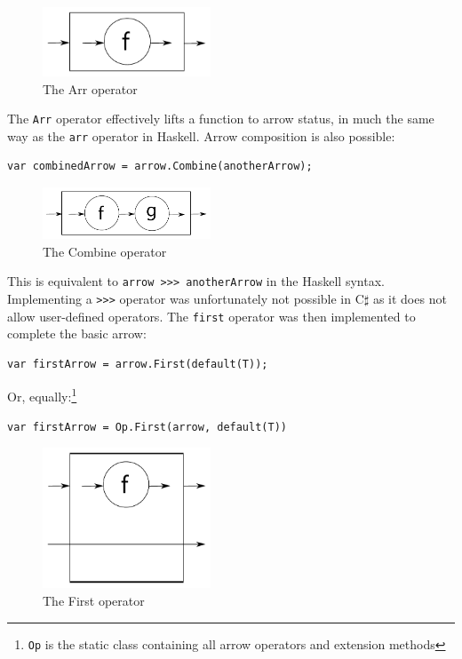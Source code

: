 \documentclass[12pt,twoside,notitlepage]{report}
\begin{document}
\begin{figure}[!ht]
  \centering
  \includegraphics[width=50mm]{fig/ArrOperator.pdf}
  \caption{The Arr operator}
  \label{fig:arr_operator}
\end{figure}

The \texttt{Arr} operator effectively lifts a function to arrow status, in much the same way as the \texttt{arr} operator in Haskell. Arrow composition is also possible:

\begin{lstlisting}[language={[Sharp]C}]
var combinedArrow = arrow.Combine(anotherArrow);
\end{lstlisting}

\begin{figure}[!ht]
  \centering
  \includegraphics[width=50mm]{fig/CompositionOperator.pdf}
  \caption{The Combine operator}
  \label{fig:combine_operator}
\end{figure}

This is equivalent to \texttt{arrow >>> anotherArrow} in the Haskell syntax. Implementing a \texttt{>>>} operator was unfortunately not possible in C$\sharp$ as it does not allow user-defined operators. The \texttt{first} operator was then implemented to complete the basic arrow:

\begin{lstlisting}[language={[Sharp]C}]
var firstArrow = arrow.First(default(T));
\end{lstlisting}

Or, equally:\footnote{\texttt{Op} is the static class containing all arrow operators and extension methods}

\begin{lstlisting}[language={[Sharp]C}]
var firstArrow = Op.First(arrow, default(T))
\end{lstlisting}

\begin{figure}[!ht]
  \centering
  \includegraphics[width=50mm]{fig/FirstOperator.pdf}
  \caption{The First operator}
  \label{fig:first_operator}
\end{figure}
\end{document}
